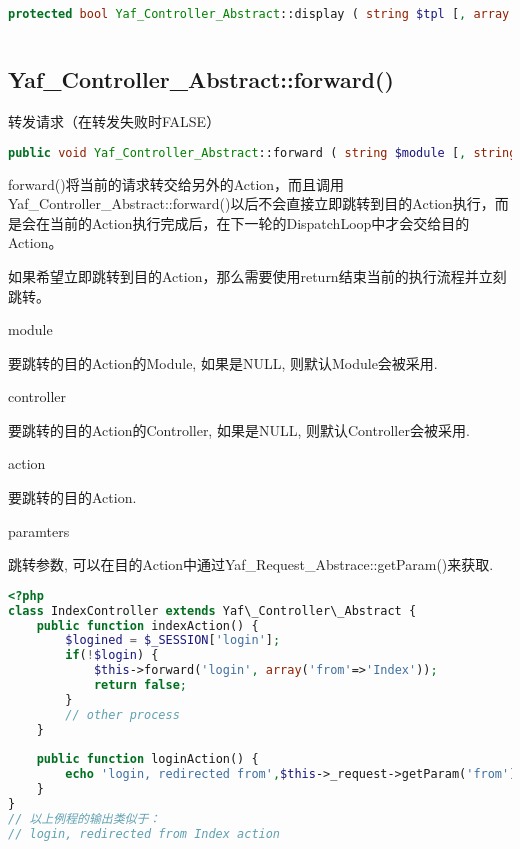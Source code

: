 \begin{lstlisting}[language=PHP]
protected bool Yaf_Controller_Abstract::display ( string $tpl [, array $parameters ] )
\end{lstlisting}



\begin{lstlisting}[language=PHP]

\end{lstlisting}

\subsection{Yaf\_Controller\_Abstract::forward()}

转发请求（在转发失败时FALSE）

\begin{lstlisting}[language=PHP]
public void Yaf_Controller_Abstract::forward ( string $module [, string $controller [, string $action [, array $paramters ]]] )
\end{lstlisting}

forward()将当前的请求转交给另外的Action，而且调用Yaf\_Controller\_Abstract::forward()以后不会直接立即跳转到目的Action执行，而是会在当前的Action执行完成后，在下一轮的DispatchLoop中才会交给目的Action。

如果希望立即跳转到目的Action，那么需要使用return结束当前的执行流程并立刻跳转。


\begin{compactitem}
\item module

要跳转的目的Action的Module, 如果是NULL, 则默认Module会被采用.

\item controller

要跳转的目的Action的Controller, 如果是NULL, 则默认Controller会被采用.

\item action

要跳转的目的Action.

\item paramters

跳转参数, 可以在目的Action中通过Yaf\_Request\_Abstrace::getParam()来获取.

\end{compactitem}


\begin{lstlisting}[language=PHP]
<?php
class IndexController extends Yaf\_Controller\_Abstract {
    public function indexAction() {
        $logined = $_SESSION['login'];
        if(!$login) {
            $this->forward('login', array('from'=>'Index'));
            return false;
        }
        // other process
    }
    
    public function loginAction() {
        echo 'login, redirected from',$this->_request->getParam('from'), ' action';
    }
}
// 以上例程的输出类似于：
// login, redirected from Index action
\end{lstlisting}

